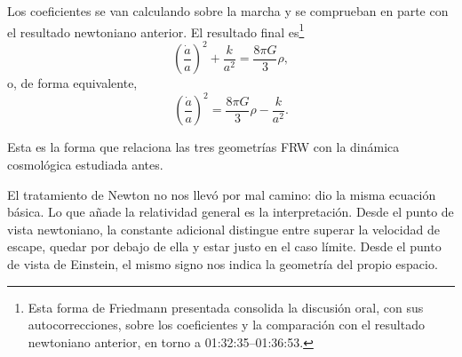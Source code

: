\begin{classroomqa}
\end{classroomqa}

Los coeficientes se van calculando sobre la marcha y se comprueban en parte con el resultado newtoniano anterior. El resultado final es\footnote{Esta forma de Friedmann presentada consolida la discusión oral, con sus autocorrecciones, sobre los coeficientes y la comparación con el resultado newtoniano anterior, en torno a 01:32:35--01:36:53.}
\begin{equation}
\left(\frac{\dot a}{a}\right)^2+\frac{k}{a^2}=\frac{8\pi G}{3}\rho,
\end{equation}
o, de forma equivalente,
\begin{equation}
\left(\frac{\dot a}{a}\right)^2=\frac{8\pi G}{3}\rho-\frac{k}{a^2}.
\end{equation}

Esta es la forma que relaciona las tres geometrías FRW con la dinámica cosmológica estudiada antes.

\begin{classroomqa}
\end{classroomqa}

\begin{classroomqa}
\end{classroomqa}

El tratamiento de Newton no nos llevó por mal camino: dio la misma ecuación básica. Lo que añade la relatividad general es la interpretación. Desde el punto de vista newtoniano, la constante adicional distingue entre superar la velocidad de escape, quedar por debajo de ella y estar justo en el caso límite. Desde el punto de vista de Einstein, el mismo signo nos indica la geometría del propio espacio.

